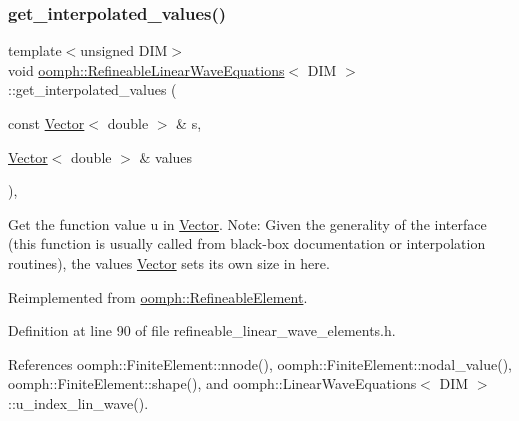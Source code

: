 \subsubsection{\texorpdfstring{get\+\_\+interpolated\+\_\+values()}{get\_interpolated\_values()}\hspace{0.1cm}{\footnotesize\ttfamily [1/2]}}
{\footnotesize\ttfamily template$<$unsigned D\+IM$>$ \\
void \hyperlink{classoomph_1_1RefineableLinearWaveEquations}{oomph\+::\+Refineable\+Linear\+Wave\+Equations}$<$ D\+IM $>$\+::get\+\_\+interpolated\+\_\+values (\begin{DoxyParamCaption}\item[{const \hyperlink{classoomph_1_1Vector}{Vector}$<$ double $>$ \&}]{s,  }\item[{\hyperlink{classoomph_1_1Vector}{Vector}$<$ double $>$ \&}]{values }\end{DoxyParamCaption})\hspace{0.3cm}{\ttfamily [inline]}, {\ttfamily [virtual]}}



Get the function value u in \hyperlink{classoomph_1_1Vector}{Vector}. Note\+: Given the generality of the interface (this function is usually called from black-\/box documentation or interpolation routines), the values \hyperlink{classoomph_1_1Vector}{Vector} sets its own size in here. 



Reimplemented from \hyperlink{classoomph_1_1RefineableElement_ad9a4f92880668a2373326d8306365c43}{oomph\+::\+Refineable\+Element}.



Definition at line 90 of file refineable\+\_\+linear\+\_\+wave\+\_\+elements.\+h.



References oomph\+::\+Finite\+Element\+::nnode(), oomph\+::\+Finite\+Element\+::nodal\+\_\+value(), oomph\+::\+Finite\+Element\+::shape(), and oomph\+::\+Linear\+Wave\+Equations$<$ D\+I\+M $>$\+::u\+\_\+index\+\_\+lin\+\_\+wave().

\mbox{\label{classoomph_1_1RefineableLinearWaveEquations_a6e1d14ebf648099505632c4b3f9ba141}} 
